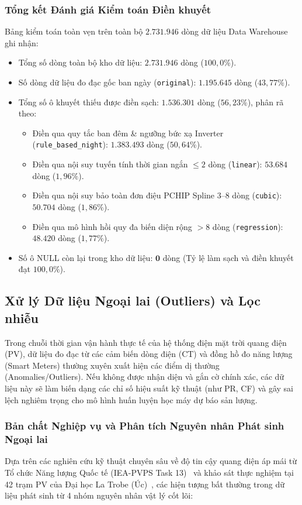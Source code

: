 \documentclass[12pt, a4paper]{report}
\begin{document}
\subsubsection{Tổng kết Đánh giá Kiểm toán Điền khuyết}
Bảng kiểm toán toàn vẹn trên toàn bộ $2.731.946$ dòng dữ liệu Data Warehouse ghi nhận:
\begin{itemize}
    \item Tổng số dòng toàn bộ kho dữ liệu: $\mathbf{2.731.946}$ dòng ($100{,}0\%$).
    \item Số dòng dữ liệu đo đạc gốc ban ngày (\texttt{original}): $\mathbf{1.195.645}$ dòng ($43{,}77\%$).
    \item Tổng số ô khuyết thiếu được điền sạch: $\mathbf{1.536.301}$ dòng ($56{,}23\%$), phân rã theo:
    \begin{itemize}
        \item Điền qua quy tắc ban đêm \& ngưỡng bức xạ Inverter (\texttt{rule\_based\_night}): $\mathbf{1.383.493}$ dòng ($50{,}64\%$).
        \item Điền qua nội suy tuyến tính thời gian ngắn $\le 2$ dòng (\texttt{linear}): $\mathbf{53.684}$ dòng ($1{,}96\%$).
        \item Điền qua nội suy bảo toàn đơn điệu PCHIP Spline $3$--$8$ dòng (\texttt{cubic}): $\mathbf{50.704}$ dòng ($1{,}86\%$).
        \item Điền qua mô hình hồi quy đa biến diện rộng $> 8$ dòng (\texttt{regression}): $\mathbf{48.420}$ dòng ($1{,}77\%$).
    \end{itemize}
    \item Số ô NULL còn lại trong kho dữ liệu: $\mathbf{0}$ dòng (Tỷ lệ làm sạch và điền khuyết đạt $100{,}0\%$).
\end{itemize}

\subsection{Xử lý Dữ liệu Ngoại lai (Outliers) và Lọc nhiễu}
\label{subsec:outlier_processing}

Trong chuỗi thời gian vận hành thực tế của hệ thống điện mặt trời quang điện (PV), dữ liệu đo đạc từ các cảm biến dòng điện (CT) và đồng hồ đo năng lượng (Smart Meters) thường xuyên xuất hiện các điểm dị thường (Anomalies/Outliers). Nếu không được nhận diện và gắn cờ chính xác, các dữ liệu này sẽ làm biến dạng các chỉ số hiệu suất kỹ thuật (như PR, CF) và gây sai lệch nghiêm trọng cho mô hình huấn luyện học máy dự báo sản lượng.

\subsubsection{Bản chất Nghiệp vụ và Phân tích Nguyên nhân Phát sinh Ngoại lai}
Dựa trên các nghiên cứu kỹ thuật chuyên sâu về độ tin cậy quang điện áp mái từ Tổ chức Năng lượng Quốc tế (IEA-PVPS Task 13)~\cite{iea2023pvps} và khảo sát thực nghiệm tại 42 trạm PV của Đại học La Trobe (Úc)~\cite{wimalaratne2022unisolar}, các hiện tượng bất thường trong dữ liệu phát sinh từ 4 nhóm nguyên nhân vật lý cốt lõi:
\end{document}
